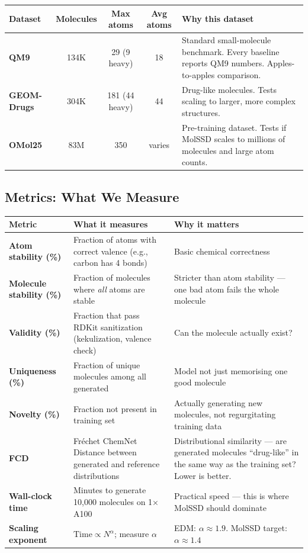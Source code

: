 \documentclass[12pt,a4paper]{article}
\begin{document}
\begin{center}
\renewcommand{\arraystretch}{1.25}
\begin{tabular}{lcccp{4.5cm}}
\toprule
\textbf{Dataset} & \textbf{Molecules} & \textbf{Max atoms} & \textbf{Avg atoms} & \textbf{Why this dataset} \\
\midrule
\textbf{QM9} & 134K & 29 (9 heavy) & 18 & Standard small-molecule benchmark. Every baseline reports QM9 numbers. Apples-to-apples comparison. \\
\textbf{GEOM-Drugs} & 304K & 181 (44 heavy) & 44 & Drug-like molecules. Tests scaling to larger, more complex structures. \\
\textbf{OMol25} & 83M & 350 & varies & Pre-training dataset. Tests if MolSSD scales to millions of molecules and large atom counts. \\
\bottomrule
\end{tabular}
\end{center}

\subsection{Metrics: What We Measure}

\begin{center}
\renewcommand{\arraystretch}{1.25}
\begin{tabular}{lp{6cm}p{4.5cm}}
\toprule
\textbf{Metric} & \textbf{What it measures} & \textbf{Why it matters} \\
\midrule
\textbf{Atom stability (\%)} & Fraction of atoms with correct valence (e.g., carbon has 4 bonds) & Basic chemical correctness \\
\textbf{Molecule stability (\%)} & Fraction of molecules where \emph{all} atoms are stable & Stricter than atom stability --- one bad atom fails the whole molecule \\
\textbf{Validity (\%)} & Fraction that pass RDKit sanitization (kekulization, valence check) & Can the molecule actually exist? \\
\textbf{Uniqueness (\%)} & Fraction of unique molecules among all generated & Model not just memorising one good molecule \\
\textbf{Novelty (\%)} & Fraction not present in training set & Actually generating new molecules, not regurgitating training data \\
\textbf{FCD} & Fr\'{e}chet ChemNet Distance between generated and reference distributions & Distributional similarity --- are generated molecules ``drug-like'' in the same way as the training set? Lower is better. \\
\textbf{Wall-clock time} & Minutes to generate 10,000 molecules on 1$\times$ A100 & Practical speed --- this is where MolSSD should dominate \\
\textbf{Scaling exponent} & $\text{Time} \propto N^{\alpha}$; measure $\alpha$ & EDM: $\alpha \approx 1.9$. MolSSD target: $\alpha \approx 1.4$ \\
\bottomrule
\end{tabular}
\end{center}
\end{document}
